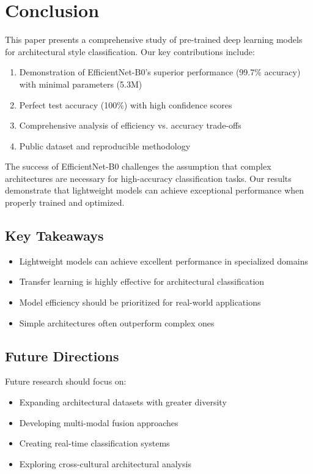 \documentclass[conference]{IEEEtran}
\begin{document}
\section{Conclusion}

This paper presents a comprehensive study of pre-trained deep learning models for architectural style classification. Our key contributions include:

\begin{enumerate}
    \item Demonstration of EfficientNet-B0's superior performance (99.7\% accuracy) with minimal parameters (5.3M)
    \item Perfect test accuracy (100\%) with high confidence scores
    \item Comprehensive analysis of efficiency vs. accuracy trade-offs
    \item Public dataset and reproducible methodology
\end{enumerate}

The success of EfficientNet-B0 challenges the assumption that complex architectures are necessary for high-accuracy classification tasks. Our results demonstrate that lightweight models can achieve exceptional performance when properly trained and optimized.

\subsection{Key Takeaways}

\begin{itemize}
    \item Lightweight models can achieve excellent performance in specialized domains
    \item Transfer learning is highly effective for architectural classification
    \item Model efficiency should be prioritized for real-world applications
    \item Simple architectures often outperform complex ones
\end{itemize}

\subsection{Future Directions}

Future research should focus on:

\begin{itemize}
    \item Expanding architectural datasets with greater diversity
    \item Developing multi-modal fusion approaches
    \item Creating real-time classification systems
    \item Exploring cross-cultural architectural analysis
\end{itemize}
\end{document}
